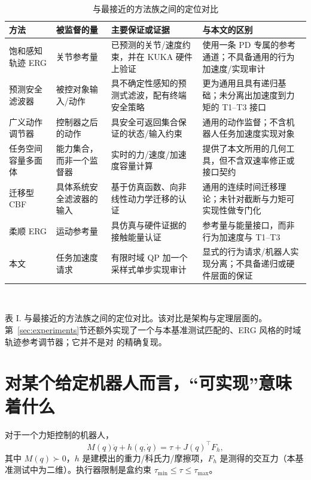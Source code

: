 \documentclass[journal]{IEEEtran}
\begin{document}
\begin{table}[t]
\caption{与最接近的方法族之间的定位对比}
\label{tab:positioning}
\centering
\footnotesize
\setlength{\tabcolsep}{4pt}
\begin{tabular}{@{}p{3.0cm}p{2.6cm}p{4.6cm}p{5.6cm}@{}}
\toprule
方法 & 被监督的量 & 主要保证或证据 & 与本文的区别 \\
\midrule
饱和感知轨迹 ERG \cite{r17} & 关节参考量 & 已预测的关节/速度约束，并在 KUKA 硬件上验证 & 使用一条 PD 专属的参考通道；不具备通用的行为加速度/实现审计 \\
预测安全滤波器 \cite{r16} & 被控对象输入/动作 & 具不确定性感知的预测式滤波，配有终端安全策略 & 更为通用且具有递归基础；未分离出加速度到力矩的 T1--T3 接口 \\
广义动作调节器 \cite{r18} & 控制器之后的动作 & 具安全可返回集合保证的状态/输入约束 & 通用的动作监督；不含机器人任务加速度实现对象 \\
任务空间容量多面体 \cite{r20} & 能力集合，而非一个监督器 & 实时的力/速度/加速度容量计算 & 提供了本文所用的几何工具，但不含双速率修正或接口契约 \\
迁移型 CBF \cite{r19} & 具体系统安全滤波器的输入 & 基于仿真函数、向非线性动力学迁移的认证 & 通用的连续时间迁移理论；未针对截断与力矩可实现性做专门化 \\
柔顺 ERG \cite{r21} & 运动参考量 & 具仿真与硬件证据的接触能量认证 & 参考量与能量接口，而非行为加速度与 T1--T3 \\
本文 & 任务加速度请求 & 有限时域 QP 加一个采样式单步实现审计 & 显式的行为请求/机器人实现分离；不具备递归或硬件层面的保证 \\
\bottomrule
\end{tabular}
\\[2pt]
\raggedright\footnotesize 表 I. 与最接近的方法族之间的定位对比。该对比是架构与定理层面的。第~\ref{sec:experiments}节还额外实现了一个与本基准测试匹配的、ERG 风格的时域轨迹参考调节器；它并不是对 \cite{r17} 的精确复现。
\end{table}

\section{对某个给定机器人而言，“可实现”意味着什么}
\label{sec:realizable}

对于一个力矩控制的机器人，
\[
M(q)\ddot q+h(q,\dot q)=\tau+J(q)^\top F_h,
\]
其中 $M(q)\succ0$，$h$ 是建模出的重力/科氏力/摩擦项，$F_h$ 是测得的交互力（本基准测试中为二维）。执行器限制是盒约束 $\tau_{\min}\le\tau\le\tau_{\max}$。
\end{document}
